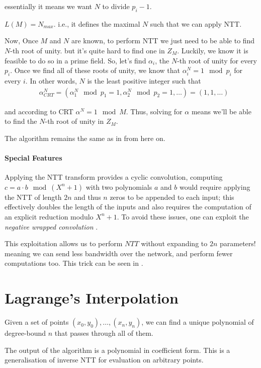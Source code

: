 essentially it means we want $ N$ to divide $p_i-1$.

\begin{corollary}
  $L(M)=N_{max}$. i.e., it defines the maximal $N$ 
  such that we can apply NTT.  
\end{corollary}

Now, Once $M$ and $N$ are known, to perform NTT we just need to be able to find 
$N$-th root of unity. but it's quite hard to find one in $Z_M$.
Luckily, we know it is feasible to do so in a prime field. 
So, let's find $\alpha_i$, the $N$-th root of unity for every $p_i$.
Once we find all of these roots of unity, we know that $\alpha_i^N=1 \mod p_i$ for every $i$.
In other words, $N$ is the least positive integer such that
\begin{align*}
  &\alpha_{CRT}^N = (\alpha_1^N \mod p_1=1, \alpha_2^N \mod p_2=1,\dots)= (1,1,\dots)
\end{align*}

and according to CRT $\alpha^N=1 \mod M$. Thus, solving for $\alpha$ 
means we'll be able to find the $N$-th root of unity in $Z_M$.

The algorithm remains the same as in  from here on.

\paragraph{Special Features}
Applying the NTT transform provides a cyclic convolution, computing 
$c = a \cdot b \mod (X^n + 1)$  with two polynomials $a$ and $b$ would require 
applying the NTT of length $2n$ and thus $n$ zeros to be appended to each input;
this effectively doubles the length of the inputs and also requires the computation of 
an explicit reduction modulo $X^n +1$. 
To avoid these issues, one can exploit the \emph{negative wrapped convolution} \cite{negantt}.

This exploitation allows us to perform $NTT$ without expanding to $2n$ parameters!
meaning we can send less bandwidth over the network, and perform fewer computations too. 
This trick can be seen in \cite{SEAL}.


\section{Lagrange's Interpolation}
Given a set of points $(x_0,y_0),\dots,(x_n,y_n)$, 
we can find a unique polynomial of degree-bound $n$ that passes through all of them.

The output of the algorithm is a polynomial in coefficient form.
This is a generalisation of inverse NTT for evaluation on arbitrary points.

